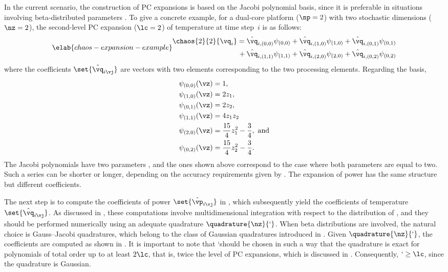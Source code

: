 In the current scenario, the construction of \ac{PC} expansions is based on the
Jacobi polynomial basis, since it is preferable in situations involving
beta-distributed parameters \cite{xiu2010}. To give a concrete example, for a
dual-core platform ($\np = 2$) with two stochastic dimensions ($\nz = 2$), the
second-level \ac{PC} expansion ($\lc = 2$) of temperature at time step~$i$ is as
follows:
\begin{equation} \elab{chaos-expansion-example}
  \begin{split}
    \chaos{2}{2}{\vq_i}
    =    {} & \hat{\vq}_{i, (0, 0)} \psi_{(0, 0)} +
              \hat{\vq}_{i, (1, 0)} \psi_{(1, 0)} +
              \hat{\vq}_{i, (0, 1)} \psi_{(0, 1)} \\
    {} + {} & \hat{\vq}_{i, (1, 1)} \psi_{(1, 1)} +
              \hat{\vq}_{i, (2, 0)} \psi_{(2, 0)} +
              \hat{\vq}_{i, (0, 2)} \psi_{(0, 2)}
  \end{split}
\end{equation}
where the coefficients $\set{\hat{\vq}_{i \vj}}$ are vectors with two elements
corresponding to the two processing elements. Regarding the basis,
\begin{align*}
  & \psi_{(0, 0)}(\vz) = 1, \\
  & \psi_{(1, 0)}(\vz) = 2 z_1, \\
  & \psi_{(0, 1)}(\vz) = 2 z_2, \\
  & \psi_{(1, 1)}(\vz) = 4 z_1 z_2 \\
  & \psi_{(2, 0)}(\vz) = \frac{15}{4} z_1^2 - \frac{3}{4}, \text{ and} \\
  & \psi_{(0, 2)}(\vz) = \frac{15}{4} z_2^2 - \frac{3}{4}.
\end{align*}
The Jacobi polynomials have two parameters \cite{xiu2010}, and the ones shown
above correspond to the case where both parameters are equal to two. Such a
series can be shorter or longer, depending on the accuracy requirements given by
\lc. The expansion of power has the same structure but different coefficients.

The next step is to compute the coefficients of power $\set{\hat{\vp}_{i \vj}}$
in , which subsequently yield the coefficients of
temperature $\set{\hat{\vq}_{i \vj}}$. As discussed in
, these computations involve multidimensional
integration with respect to the distribution of \vz, and they should be
performed numerically using an adequate quadrature $\quadrature{\nz}{\lq}$. When
beta distributions are involved, the natural choice is Gauss--Jacobi
quadratures, which belong to the class of Gaussian quadratures introduced in
. Given $\quadrature{\nz}{\lq}$, the coefficients
are computed as shown in . It is important to note that
\lq should be chosen in such a way that the quadrature is exact for polynomials
of total order up to at least $2 \lc$, that is, twice the level of \ac{PC}
expansions, which is discussed in . Consequently, $\lq
\geq \lc$, since the quadrature is Gaussian.

